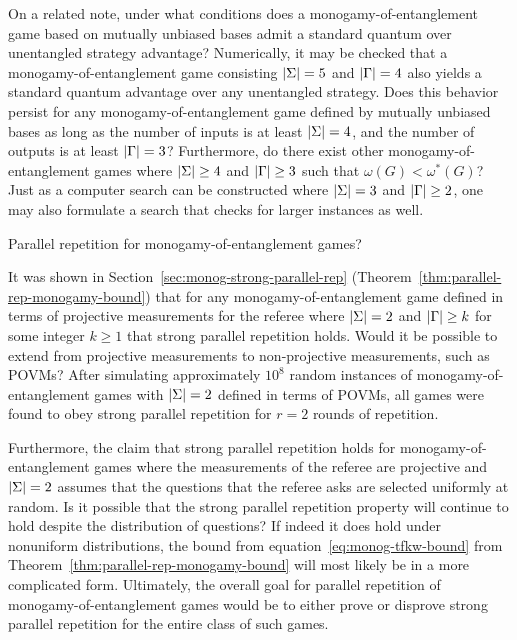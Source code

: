 	On a related note, under what conditions does a monogamy-of-entanglement game based on mutually unbiased bases admit a standard quantum over unentangled strategy advantage? Numerically, it may be checked that a monogamy-of-entanglement game consisting $\left\lvert \Sigma \right\rvert = 5$ and $\left\lvert \Gamma \right\rvert = 4$ also yields a standard quantum advantage over any unentangled strategy. Does this behavior persist for any monogamy-of-entanglement game defined by mutually unbiased bases as long as the number of inputs is at least $\left\lvert \Sigma \right\rvert = 4$, and the number of outputs is at least $\left\lvert \Gamma \right\rvert = 3$? Furthermore, do there exist other monogamy-of-entanglement games where $\left\lvert \Sigma \right\rvert \geq 4$ and $\left\lvert \Gamma \right\rvert \geq 3$ such that $\omega(G) < \omega^*(G)$? Just as a computer search can be constructed where $\left\lvert \Sigma \right\rvert = 3$ and $\left\lvert \Gamma \right\rvert \geq 2$, one may also formulate a search that checks for larger instances as well. 

\begin{question}
	Parallel repetition for monogamy-of-entanglement games?
\end{question} 

It was shown in Section~\ref{sec:monog-strong-parallel-rep} (Theorem~\ref{thm:parallel-rep-monogamy-bound}) that for any monogamy-of-entanglement game defined in terms of projective measurements for the referee where $\left\lvert \Sigma \right\rvert = 2$ and $\left\lvert \Gamma \right\rvert \geq k$ for some integer $k \geq 1$ that strong parallel repetition holds. Would it be possible to extend from projective measurements to non-projective measurements, such as POVMs? After simulating approximately $10^8$ random instances of monogamy-of-entanglement games with $\left\lvert \Sigma \right\rvert = 2$ defined in terms of POVMs, all games were found to obey strong parallel repetition for $r = 2$ rounds of repetition.   

Furthermore, the claim that strong parallel repetition holds for monogamy-of-entanglement games where the measurements of the referee are projective and $\left\lvert \Sigma \right\rvert = 2$ assumes that the questions that the referee asks are selected uniformly at random. Is it possible that the strong parallel repetition property will continue to hold despite the distribution of questions? If indeed it does hold under nonuniform distributions, the bound from equation~\eqref{eq:monog-tfkw-bound} from Theorem~\ref{thm:parallel-rep-monogamy-bound} will most likely be in a more complicated form. Ultimately, the overall goal for parallel repetition of monogamy-of-entanglement games would be to either prove or disprove strong parallel repetition for the entire class of such games. 

